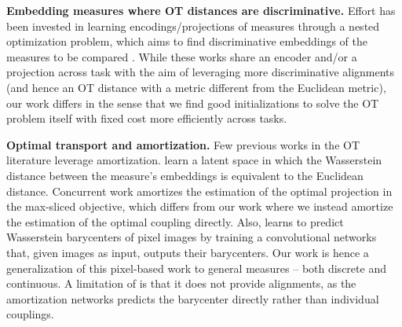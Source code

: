 \documentclass{article}
\begin{document}
\textbf{Embedding measures where OT distances are discriminative.}
Effort has been invested in learning encodings/projections of measures
through a nested optimization problem, which aims to find
discriminative embeddings of the measures to be compared
\citep{pmlr-v84-genevay18a, deshpande2019max,nguyen2022amortized}.
While these works share an encoder and/or a projection across task
with the aim of leveraging more discriminative alignments (and hence
an OT distance with a metric different from the Euclidean metric), our
work differs in the sense that we find good initializations to solve
the OT problem itself with fixed cost more efficiently across tasks.

\textbf{Optimal transport and amortization.}
Few previous works in the OT literature leverage
amortization. \citet{courty2018learning} learn a latent space in which
the Wasserstein distance between the measure's embeddings is
equivalent to the Euclidean distance. Concurrent work
\citep{nguyen2022amortized} amortizes the estimation of the optimal
projection in the max-sliced objective, which differs from our work
where we instead amortize the estimation of the optimal coupling
directly. Also, \citet{lacombe2021learning} learns to predict
Wasserstein barycenters of pixel images by training a convolutional
networks that, given images as input, outputs their barycenters. Our
work is hence a generalization of this pixel-based work to general
measures -- both discrete and continuous. A limitation of
\citet{lacombe2021learning} is that it does not provide alignments, as
the amortization networks predicts the barycenter directly rather than
individual couplings.
\end{document}
